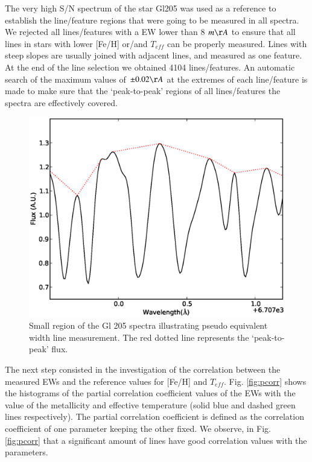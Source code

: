 \documentclass{aa}
\begin{document}
The very high S/N spectrum of the star Gl205 was used as a reference to establish the line/feature regions that were going to be measured in all spectra. We rejected all lines/features with a EW lower than 8 $m\AA$ to ensure that all lines in stars with lower [Fe/H] or/and $T_{eff}$ can be properly measured.  Lines with steep slopes are usually joined with adjacent lines, and measured as one feature. At the end of the line selection we obtained 4104 lines/features. An automatic search of the maximum values of $\pm0.02 \AA$ at the extremes of each line/feature is made to make sure that the `peak-to-peak' regions of all lines/features the spectra are effectively covered. 


\begin{figure}[h]
\begin{center}
\includegraphics[scale=0.45]{pics/template.eps}
\end{center}
\caption{Small region of the Gl 205 spectra illustrating pseudo equivalent width line measurement. The red dotted line represents the `peak-to-peak' flux.}
\label{fig:spec}
\end{figure}

The next step consisted in the investigation of the correlation between the measured EWs and the reference values for [Fe/H] and $T_{eff}$. Fig. \ref{fig:pcorr} shows the histograms of the partial correlation coefficient values of the EWs with the value of the metallicity and effective temperature (solid blue and dashed green lines respectively). The partial correlation coefficient is defined as the correlation coefficient of one parameter keeping the other fixed. %
We observe, in Fig. \ref{fig:pcorr} that a significant amount of lines have good correlation values with the parameters. 
\end{document}
